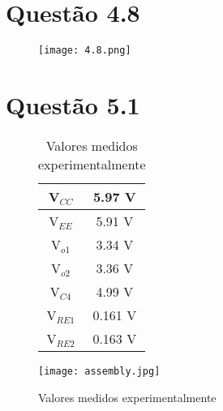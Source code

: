 \documentclass[a4paper,9pt]{extarticle}
\begin{document}
	 \section{Questão 4.8}
	 	\begin{figure}[H]
                            \centering
                            \captionsetup{justification=centering}
                            \texttt{[image: 4.8.png]}
                            \caption{}
                    \end{figure}
	\newpage 
	\section{Questão 5.1}
	 \begin{figure}[h]
		 \centering
		\begin{minipage}[c]{0.2 \textwidth}
	 		\begin{table}[H]
				\captionsetup{justification=centering}
						 \begin{tabular}{|c||c|}	
					\hline
						V$_{CC}$  & 5.97 V \\ \hline
						V$_{EE}$  & 5.91 V \\ \hline
						V$_{o1}$  & 3.34 V \\ \hline
						V$_{o2}$  & 3.36 V \\ \hline
						V$_{C4}$  & 4.99 V \\ \hline
						V$_{RE1}$ &0.161  V \\ \hline
						V$_{RE2}$ &0.163 V \\ \hline
				
				\end{tabular}
				\caption{Valores medidos experimentalmente}
			\end{table}
		\end{minipage}
		\hspace{0.1\textwidth}	
                                \begin{minipage}[T]{0.4\textwidth}
                                          \centering
                                          \captionsetup{justification=centering}
                                          \texttt{[image: assembly.jpg]}

                                \end{minipage}
			\end{figure}
\end{document}
